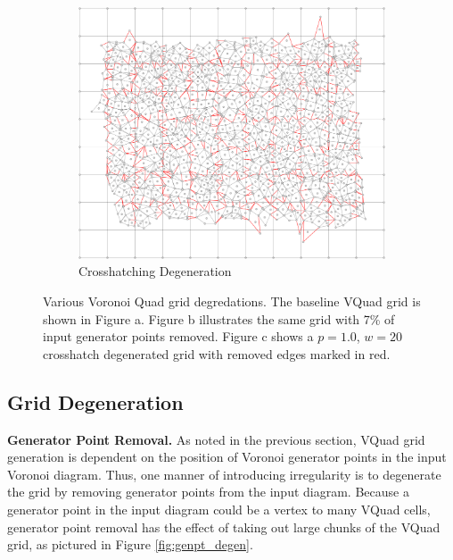 \documentclass[a4paper,11pt]{article}
\begin{document}
\begin{figure}[htp]
  \begin{subfigure}[t]{0.6\textwidth}
  \centering
  \includegraphics[width=\textwidth]{ch3_figs/ch_p100_w20}
  \caption{Crosshatching Degeneration}
  \label{fig:crosshatch_degen}
  \end{subfigure}

  \caption[Voronoi Quad Grid Variations]{
    Various Voronoi Quad grid degredations. The baseline VQuad grid is shown in Figure a. Figure b illustrates the same grid with 7\% of input generator points removed. Figure c shows a $p=1.0$, $w=20$ crosshatch degenerated grid with removed edges marked in red.
  }


\end{figure}

\subsection{Grid Degeneration}

\label{subsec:gen_pt_rem}
\noindent \textbf{Generator Point Removal.} As noted in the previous section, VQuad grid generation is dependent on the position of Voronoi generator points in the input Voronoi diagram. Thus, one manner of introducing irregularity is to degenerate the grid by removing generator points from the input diagram. Because a generator point in the input diagram could be a vertex to many VQuad cells, generator point removal has the effect of taking out large chunks of the VQuad grid, as pictured in Figure \ref{fig:genpt_degen}.
\end{document}
